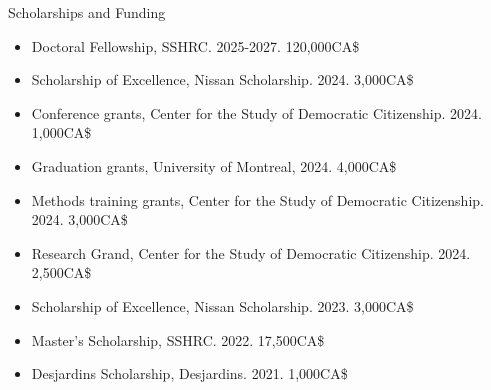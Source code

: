 \documentclass{resume} %
\begin{document}
\begin{rSection}{Scholarships and Funding}
\begin{itemize} 
  \item Doctoral Fellowship, SSHRC. 2025-2027. 120,000CA\$
  \item Scholarship of Excellence, Nissan Scholarship. 2024. 3,000CA\$
  \item Conference grants, Center for the Study of Democratic Citizenship. 2024. 1,000CA\$
  \item Graduation grants, University of Montreal, 2024. 4,000CA\$
  \item Methods training grants, Center for the Study of Democratic Citizenship. 2024. 3,000CA\$
  \item Research Grand, Center for the Study of Democratic Citizenship. 2024. 2,500CA\$
  \item Scholarship of Excellence, Nissan Scholarship. 2023. 3,000CA\$
  \item Master's Scholarship, SSHRC. 2022. 17,500CA\$
  \item Desjardins Scholarship, Desjardins. 2021. 1,000CA\$
\end{itemize}

\end{rSection}
\end{document}
